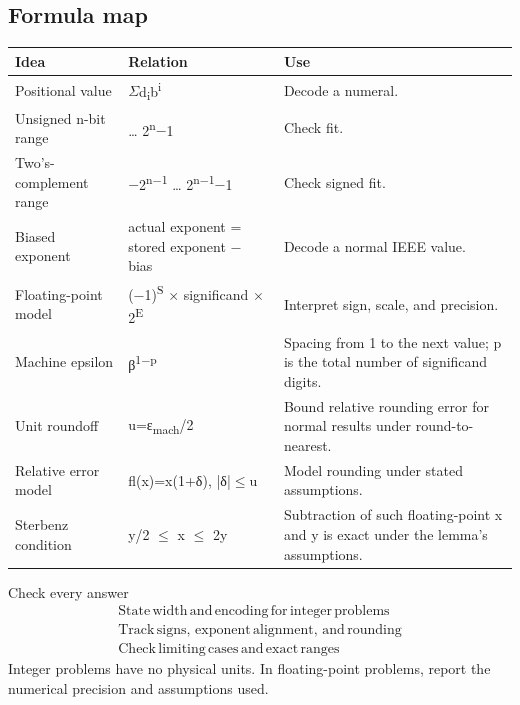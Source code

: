 \documentclass[11pt]{article}
\begin{document}
\begin{keepsection}
\section{Formula map}

\begin{center}\small\begin{tabularx}{\linewidth}{>{\raggedright\arraybackslash}X>{\raggedright\arraybackslash}X>{\raggedright\arraybackslash}X}\toprule
\textbf{Idea} & \textbf{Relation} & \textbf{Use} \\ \midrule
Positional value & \ensuremath{\Sigma}d\textsubscript{i}b\textsuperscript{i} & Decode a numeral. \\
Unsigned n-bit range & 0 … 2\textsuperscript{n}\ensuremath{-}1 & Check fit. \\
Two’s-complement range & \ensuremath{-}2\textsuperscript{n\ensuremath{-}1} … 2\textsuperscript{n\ensuremath{-}1}\ensuremath{-}1 & Check signed fit. \\
Biased exponent & actual exponent = stored exponent \ensuremath{-} bias & Decode a normal IEEE value. \\
Floating-point model & (\ensuremath{-}1)\textsuperscript{S} \ensuremath{\times} significand \ensuremath{\times} 2\textsuperscript{E} & Interpret sign, scale, and precision. \\
Machine epsilon & β\textsuperscript{1\ensuremath{-}p} & Spacing from 1 to the next value; p is the total number of significand digits. \\
Unit roundoff & u=ε\textsubscript{mach}/2 & Bound relative rounding error for normal results under round-to-nearest. \\
Relative error model & fl(x)=x(1+δ), |δ|\ensuremath{\leq}u & Model rounding under stated assumptions. \\
Sterbenz condition & y/2 \ensuremath{\leq} x \ensuremath{\leq} 2y & Subtraction of such floating-point x and y is exact under the lemma's assumptions. \\
\bottomrule\end{tabularx}\end{center}

\begin{equationcard}{Check every answer}
\[ \begin{gathered} \text{State}\, \text{width}\, \text{and}\, \text{encoding}\, \text{for}\, \text{integer}\, \text{problems} \\ \text{Track}\, \text{signs},\, \text{exponent}\, \text{alignment},\, \text{and}\, \text{rounding} \\ \text{Check}\, \text{limiting}\, \text{cases}\, \text{and}\, \text{exact}\, \text{ranges} \end{gathered} \]
{\small Integer problems have no physical units. In floating-point problems, report the numerical precision and assumptions used.}
\end{equationcard}
\end{keepsection}
\end{document}
